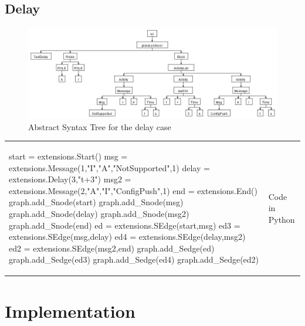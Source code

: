 \documentclass[a4paper,11pt,twoside]{report}
\begin{document}
\section{Delay}
\begin{figure}[h]
\begin{center}
\includegraphics[width=18cm]{delayAST}\caption{Abstract Syntax Tree for the delay case}
\end{center}
\label{fig:DelayAST}
\end{figure}
\begin{tabular}{ll}
\begin{SJLISTING}
start = extensions.Start()
msg = extensions.Message(1,"I","A","NotSupported",1)
delay = extensions.Delay(3,"t+3")
msg2 = extensions.Message(2,"A","I","ConfigPush",1)
end = extensions.End()
graph.add_Snode(start)
graph.add_Snode(msg)
graph.add_Snode(delay)
graph.add_Snode(msg2)
graph.add_Snode(end)
ed = extensions.SEdge(start,msg)
ed3 = extensions.SEdge(msg,delay)
ed4 = extensions.SEdge(delay,msg2)
ed2 = extensions.SEdge(msg2,end)
graph.add_Sedge(ed)
graph.add_Sedge(ed3)
graph.add_Sedge(ed4)
graph.add_Sedge(ed2)
\end{SJLISTING}
&  Code in Python
\end{tabular}

\chapter{Implementation}
\end{document}
